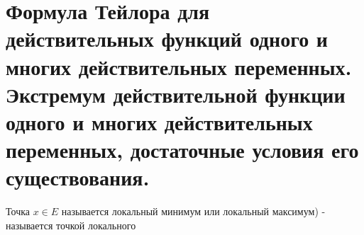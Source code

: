 \section{Формула Тейлора для действительных функций одного и многих действительных переменных. Экстремум действительной функции одного и многих действительных переменных, достаточные условия его существования.}

\begin{defs}
	Точка $x \in E$ называется локальный минимум или локальный максимум) -  называется точкой локального 
\end{defs}
